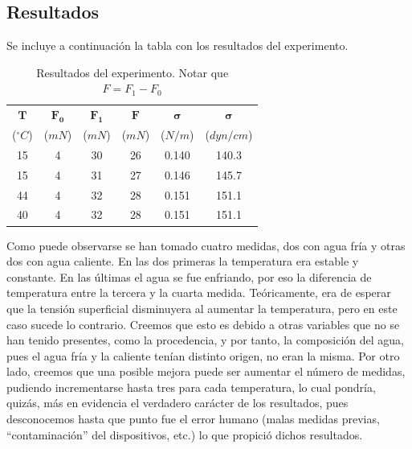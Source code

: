 \documentclass[12pt,a4paper]{article}
\newcommand{\grad}{^{\circ}}
\begin{document}
\subsection*{Resultados}

Se incluye a continuación la tabla con los resultados del experimento.
    
\begin{table}[htbp]
  \begin{center}
    \begin{tabular}{cccccc}
    \toprule
    \multicolumn{1}{c}{$\mathbf{T}$} & \multicolumn{1}{c}{$\mathbf{F_{0}}$} & \multicolumn{1}{c}{$\mathbf{F_{1}}$} & \multicolumn{1}{c}{$\mathbf{F}$} & \multicolumn{1}{c}{$\boldsymbol{\sigma}$} & \multicolumn{1}{c}{$\boldsymbol{\sigma}$} \bigstrut[t]\\
    {\small ($\grad C$)} & {\small ($mN$)} & {\small ($mN$)} & {\small ($mN$)} & {\small ($N/m$)} & {\small ($dyn/cm$)}\bigstrut[b]\\
    \midrule
    15 & 4 & 30 & 26 & 0.140 & 140.3 \\
    15 & 4 & 31 & 27 & 0.146 & 145.7 \\
    44 & 4 & 32 & 28 & 0.151 & 151.1 \\
    40 & 4 & 32 & 28 & 0.151 & 151.1 \\
    \bottomrule
    \end{tabular}
    \end{center}
  \caption{Resultados del experimento. Notar que $F=F_{1}-F_{0}$}
  \label{tab1}
\end{table}

Como puede observarse se han tomado cuatro medidas, dos con agua fría y otras dos con agua caliente. En las dos primeras la temperatura era estable y constante. En las últimas el agua se fue enfriando, por eso la diferencia de temperatura entre la tercera y la cuarta medida.
Teóricamente, era de esperar que la tensión superficial disminuyera al aumentar la temperatura, pero en este caso sucede lo contrario. Creemos que esto es debido a otras variables que no se han tenido presentes, como la procedencia, y por tanto, la composición del agua, pues el agua fría y la caliente tenían distinto origen, no eran la misma. Por otro lado, creemos que una posible mejora puede ser aumentar el número de medidas, pudiendo incrementarse hasta tres para cada temperatura, lo cual pondría, quizás, más en evidencia el verdadero carácter de los resultados, pues desconocemos hasta que punto fue el error humano (malas medidas previas, ``contaminación'' del dispositivos, etc.) lo que propició dichos resultados.
\end{document}
